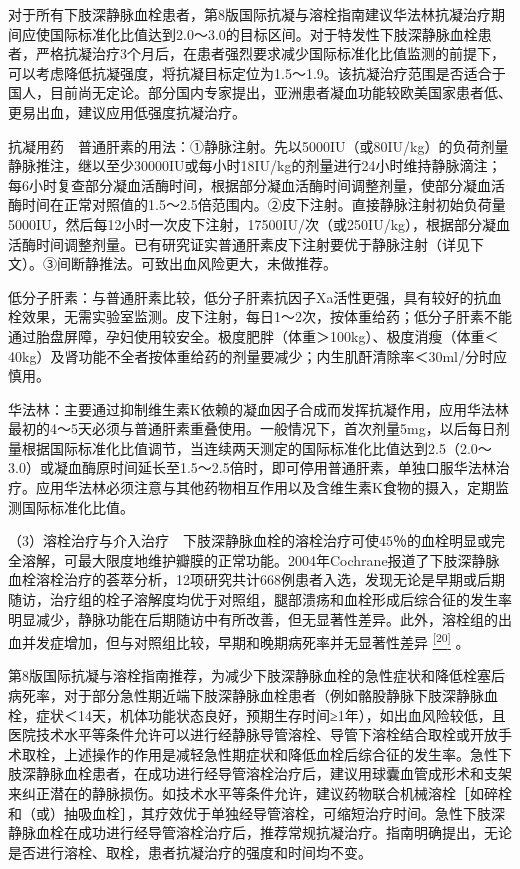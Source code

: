 对于所有下肢深静脉血栓患者，第8版国际抗凝与溶栓指南建议华法林抗凝治疗期间应使国际标准化比值达到2.0～3.0的目标区间。对于特发性下肢深静脉血栓患者，严格抗凝治疗3个月后，在患者强烈要求减少国际标准化比值监测的前提下，可以考虑降低抗凝强度，将抗凝目标定位为1.5～1.9。该抗凝治疗范围是否适合于国人，目前尚无定论。部分国内专家提出，亚洲患者凝血功能较欧美国家患者低、更易出血，建议应用低强度抗凝治疗。

抗凝用药　普通肝素的用法：①静脉注射。先以5000IU（或80IU/kg）的负荷剂量静脉推注，继以至少30000IU或每小时18IU/kg的剂量进行24小时维持静脉滴注；每6小时复查部分凝血活酶时间，根据部分凝血活酶时间调整剂量，使部分凝血活酶时间在正常对照值的1.5～2.5倍范围内。②皮下注射。直接静脉注射初始负荷量5000IU，然后每12小时一次皮下注射，17500IU/次（或250IU/kg），根据部分凝血活酶时间调整剂量。已有研究证实普通肝素皮下注射要优于静脉注射（详见下文）。③间断静推法。可致出血风险更大，未做推荐。

低分子肝素：与普通肝素比较，低分子肝素抗因子Xa活性更强，具有较好的抗血栓效果，无需实验室监测。皮下注射，每日1～2次，按体重给药；低分子肝素不能通过胎盘屏障，孕妇使用较安全。极度肥胖（体重＞100kg）、极度消瘦（体重＜40kg）及肾功能不全者按体重给药的剂量要减少；内生肌酐清除率＜30ml/分时应慎用。

华法林：主要通过抑制维生素K依赖的凝血因子合成而发挥抗凝作用，应用华法林最初的4～5天必须与普通肝素重叠使用。一般情况下，首次剂量5mg，以后每日剂量根据国际标准化比值调节，当连续两天测定的国际标准化比值达到2.5（2.0～3.0）或凝血酶原时间延长至1.5～2.5倍时，即可停用普通肝素，单独口服华法林治疗。应用华法林必须注意与其他药物相互作用以及含维生素K食物的摄入，定期监测国际标准化比值。

（3）溶栓治疗与介入治疗　下肢深静脉血栓的溶栓治疗可使45％的血栓明显或完全溶解，可最大限度地维护瓣膜的正常功能。2004年Cochrane报道了下肢深静脉血栓溶栓治疗的荟萃分析，12项研究共计668例患者入选，发现无论是早期或后期随访，治疗组的栓子溶解度均优于对照组，腿部溃疡和血栓形成后综合征的发生率明显减少，静脉功能在后期随访中有所改善，但无显著性差异。此外，溶栓组的出血并发症增加，但与对照组比较，早期和晚期病死率并无显著性差异
\protect\hyperlink{text00022.htmlux5cux23ch20-21}{\textsuperscript{{[}20{]}}}
。

第8版国际抗凝与溶栓指南推荐，为减少下肢深静脉血栓的急性症状和降低栓塞后病死率，对于部分急性期近端下肢深静脉血栓患者（例如骼股静脉下肢深静脉血栓，症状＜14天，机体功能状态良好，预期生存时间≥1年），如出血风险较低，且医院技术水平等条件允许可以进行经静脉导管溶栓、导管下溶栓结合取栓或开放手术取栓，上述操作的作用是减轻急性期症状和降低血栓后综合征的发生率。急性下肢深静脉血栓患者，在成功进行经导管溶栓治疗后，建议用球囊血管成形术和支架来纠正潜在的静脉损伤。如技术水平等条件允许，建议药物联合机械溶栓［如碎栓和（或）抽吸血栓］，其疗效优于单独经导管溶栓，可缩短治疗时间。急性下肢深静脉血栓在成功进行经导管溶栓治疗后，推荐常规抗凝治疗。指南明确提出，无论是否进行溶栓、取栓，患者抗凝治疗的强度和时间均不变。

